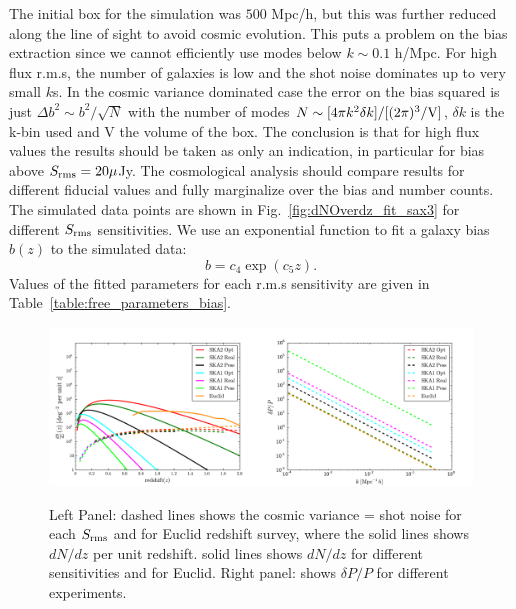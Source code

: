 \documentclass[useAMS,usenatbib]{mn2e}
\begin{document}
The initial box for the simulation was $500$ Mpc/h, but this was further reduced along the line of sight to avoid cosmic evolution. This puts a problem on the bias extraction since we cannot efficiently use modes below $k\sim 0.1$ h/Mpc. For high flux r.m.s, the number of galaxies is low and the shot noise dominates up to very small $k$s. In the cosmic variance dominated case the error on the bias squared is just $\Delta b^2 \sim b^2/\sqrt{N}$ with the number of modes $N\sim [4 \pi k^2 \delta k]/[(2\pi)^3/{\rm V}]$, $\delta k$ is the k-bin used and V the volume of the box. The conclusion is that for high flux values the results should be taken as only an indication, in particular for bias above $S_{\rm rms} = 20 \mu$Jy. The cosmological analysis should compare results for different fiducial values and fully marginalize over the bias and number counts.
The simulated data points are shown in Fig.~\ref{fig:dNOverdz_fit_sax3} for different $S_{\rm{rms}}$ sensitivities. We use an exponential function to fit a galaxy bias $b(z)$ to the simulated data:
  \begin{equation}\label{bias}
  b = c_4 \exp({c_5z}).
  \end{equation}
Values of the fitted parameters  for each  r.m.s  sensitivity are given in Table~\ref{table:free_parameters_bias}.


\begin{figure}
\begin{center}
\includegraphics[width=0.5\textwidth]{plots/cosmic_Variance.pdf}\includegraphics[width=0.5\textwidth]{plots/deltaP_ov_p_Euclid.pdf}
\caption{Left Panel: dashed lines shows the cosmic variance = shot noise for each $S_{\rm rms}$ and for Euclid redshift survey, where the solid lines shows $dN/dz$ per unit redshift. solid lines shows $dN/dz$ for different sensitivities and for Euclid. Right panel: shows $\delta P/P$ for different experiments.} 
\label{fig:cosmic_variance}
\end{center}
\end{figure}
\end{document}
